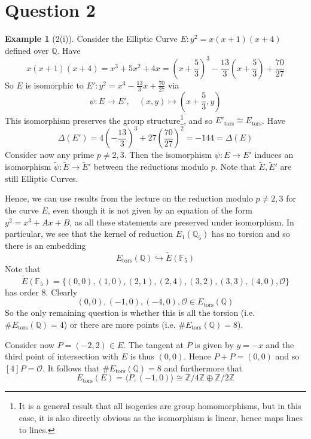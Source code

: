 \documentclass{scrartcl}
\newcommand{\Z}{\mathbb{Z}}
\newcommand{\F}{\mathbb{F}}
\newcommand{\Q}{\mathbb{Q}}
\renewcommand{\O}{\mathcal{O}}
\theoremstyle{definition}
\newtheorem{example}[subsection]{Example}
\begin{document}
\section{Question 2}
\begin{example}[2(i)]
    Consider the Elliptic Curve $E: y^2 = x(x + 1)(x + 4)$ defined over $\Q$.
    Have
    \begin{equation*}
        x(x + 1)(x + 4) = x^3 + 5x^2 + 4x = \left( x + \frac 5 3 \right)^3 - \frac {13} 3 \left( x + \frac 5 3 \right) + \frac {70} {27}
    \end{equation*}
    So $E$ is isomorphic to $E': y^2 = x^3 - \frac {13} 3 x + \frac {70} {27}$ via
    \begin{equation*}
        \psi: E \to E', \quad (x, y) \mapsto \left( x + \frac 5 3, y \right)
    \end{equation*}
    This isomorphism preserves the group structure\footnote{It is a general result that all isogenies are group homomorphisms, but in this case, it is also directly obvious as the isomorphism is linear, hence maps lines to lines.}, and so $E'_{\mathrm{tors}} \cong E_{\mathrm{tors}}$.
    Have
    \begin{equation*}
        \Delta(E') = 4 \left( -\frac {13} 3 \right)^3 + 27 \left( \frac {70} {27} \right)^2 = -144 = \Delta(E)
    \end{equation*}
    Consider now any prime $p \neq 2, 3$.
    Then the isomorphism $\psi: E \to E'$ induces an isomorphism $\tilde{\psi}: \tilde{E} \to \tilde{E}'$ between the reductions modulo $p$.
    Note that $\tilde{E}, \tilde{E}'$ are still Elliptic Curves.

    Hence, we can use results from the lecture on the reduction modulo $p \neq 2, 3$ for the curve $E$, even though it is not given by an equation of the form $y^2 = x^3 + Ax + B$, as all these statements are preserved under isomorphism.
    In particular, we see that the kernel of reduction $E_1(\Q_5)$ has no torsion and so there is an embedding
    \begin{equation*}
        E_{\mathrm{tors}}(\Q) \hookrightarrow \tilde{E}(\F_5)
    \end{equation*}
    Note that
    \begin{equation*}
        \tilde{E}(\F_5) = \{ (0, 0), (1, 0), (2, 1), (2, 4), (3, 2), (3, 3), (4, 0), \O \}
    \end{equation*}
    has order 8.
    Clearly
    \begin{equation*}
        (0, 0), (-1, 0), (-4, 0), \O \in E_{\mathrm{tors}}(\Q)
    \end{equation*}
    So the only remaining question is whether this is all the torsion (i.e. $\#E_{\mathrm{tors}}(\Q) = 4$) or there are more points (i.e. $\#E_{\mathrm{tors}}(\Q) = 8$).

    Consider now $P = (-2, 2) \in E$.
    The tangent at $P$ is given by $y = -x$ and the third point of intersection with $E$ is thus $(0, 0)$.
    Hence $P + P = (0, 0)$ and so $[4]P = \O$.
    It follows that $\#E_{\mathrm{tors}}(\Q) = 8$ and furthermore that 
    \begin{equation*}
        E_{\mathrm{tors}}(E) = \langle P, (-1, 0) \rangle \cong \Z/4\Z \oplus \Z/2\Z
    \end{equation*}
\end{example}
\end{document}
